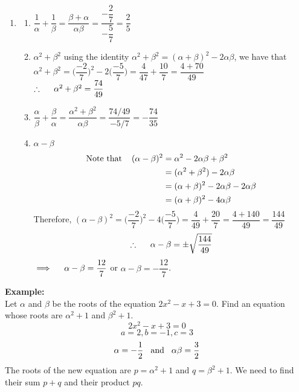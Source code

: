 \documentclass[11pt,a4paper]{article}
\begin{document}
\begin{enumerate}
\item[]
\begin{enumerate}
\item $\dfrac{1}{\alpha}+\dfrac{1}{\beta}=\dfrac{\beta +\alpha}{\alpha \beta}=\dfrac{-\dfrac{2}{7}}{-\dfrac{5}{7}}=\dfrac{2}{5}$\\
\item $\alpha^2+\beta^2$ using the identity $\alpha^2+\beta^2=(\alpha+\beta)^2-2\alpha \beta$, we have that\\

$\alpha^2+\beta^2=\bigg(\dfrac{-2}{7}\bigg)^2-2\bigg(\dfrac{-5}{7}\bigg)=\dfrac{4}{47}+\dfrac{10}{7}=\dfrac{4+70}{49}$\\

$\therefore \hspace{0.5cm} \alpha^2+\beta^2=\dfrac{74}{49}$\\
\item $\dfrac{\alpha}{\beta}+\dfrac{\beta}{\alpha}=\dfrac{\alpha^2+\beta^2}{\alpha \beta}=\dfrac{74/49}{-5/7}=-\dfrac{74}{35}$\\
\item $\alpha-\beta$
\begin{align*}
\text{Note that}\hspace{0.4cm} (\alpha-\beta)^2 & = \alpha^2-2\alpha \beta +\beta^2\\
                                                & = (\alpha^2+\beta^2)-2\alpha \beta\\
                                                & = (\alpha + \beta)^2-2\alpha \beta -2\alpha \beta\\
                                                & = (\alpha + \beta)^2-4\alpha \beta\\
\end{align*}
Therefore, $(\alpha-\beta)^2=\bigg(\dfrac{-2}{7}\bigg)^2-4\bigg(\dfrac{-5}{7}\bigg)=\dfrac{4}{49}+\dfrac{20}{7}=\dfrac{4+140}{49}=\dfrac{144}{49}$
$$\therefore\hspace{0.5cm} \alpha -\beta =\pm \sqrt{\frac{144}{49}}$$
$\implies\hspace{0.4cm} \alpha-\beta=\dfrac{12}{7}$ or $\alpha-\beta=-\dfrac{12}{7}$.\\
\end{enumerate}
\end{enumerate}


\textbf{Example:}\\
Let $\alpha$ and $\beta$ be the roots of the equation $2x^2-x+3=0$. Find an equation whose roots are $\alpha^2+1$ and $\beta^2+1$. $$2x^2-x+3=0$$ $$a=2, b=-1, c=3$$ $$\alpha=-\frac{1}{2}\hspace{0.3cm}\text{and}\hspace{0.3cm} \alpha \beta = \frac{3}{2}$$
The roots of the new equation are $p=\alpha^2+1$ and $q=\beta^2+1$. We need to find their sum $p+q$ and their product $pq$.\\
\end{document}
